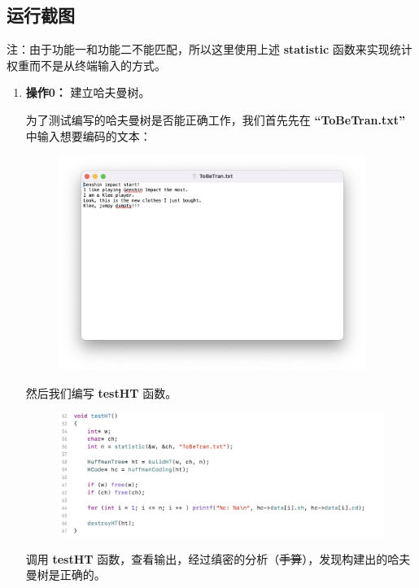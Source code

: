     \subsection{运行截图}
        \par 注：由于功能一和功能二不能匹配，所以这里使用上述 \textbf{statistic} 函数来实现统计权重而不是从终端输入的方式。
        \begin{enumerate}
            \item \textbf{操作0：} 建立哈夫曼树。
                \par 为了测试编写的哈夫曼树是否能正确工作，我们首先先在 \textbf{``ToBeTran.txt''} 中输入想要编码的文本：
                \begin{figure}[htbp]
                    \centering
                    \includegraphics*[width = 10cm]{s3_0.png}
                \end{figure}
                \par 然后我们编写 \textbf{testHT} 函数。
                \begin{figure}[htbp]
                    \hspace*{1.2cm}
                    \includegraphics*[width = 12cm]{s3_1.png}
                \end{figure}
                \par 调用 \textbf{testHT} 函数，查看输出，经过缜密的分析（\sout{手算}），发现构建出的哈夫曼树是正确的。
                \begin{figure}[h]

\end{figure}
\end{enumerate}
